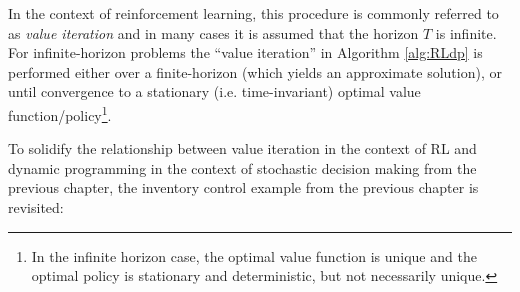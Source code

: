 In the context of reinforcement learning, this procedure is commonly referred to as \textit{value iteration} and in many cases it is assumed that the horizon $T$ is infinite. For infinite-horizon problems the ``value iteration'' in Algorithm \ref{alg:RLdp} is performed either over a finite-horizon (which yields an approximate solution), or until convergence to a stationary (i.e. time-invariant) optimal value function/policy\footnote{In the infinite horizon case, the optimal value function is unique and the optimal policy is stationary and deterministic, but not necessarily unique.}.

To solidify the relationship between value iteration in the context of RL and dynamic programming in the context of stochastic decision making from the previous chapter, the inventory control example from the previous chapter is revisited:
